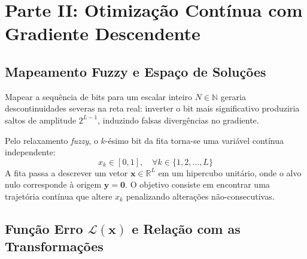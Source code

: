 \documentclass[
	12pt,
	a4paper,
	article,
	twocolumn,
	brazil
]{abntex2}
\begin{document}
\begin{table}[htbp]
\centering
\caption{Desempenho da Busca Gulosa com Poda ($h_2$) até $L = 4096$.}
\label{tab:bench}
\end{table}

\section{Parte II: Otimização Contínua com Gradiente Descendente}

\subsection{Mapeamento Fuzzy e Espaço de Soluções}

Mapear a sequência de bits para um escalar inteiro $N \in \mathbb{N}$ geraria descontinuidades severas na reta real: inverter o bit mais significativo produziria saltos de amplitude $2^{L-1}$, induzindo falsas divergências no gradiente.

Pelo relaxamento \textit{fuzzy}, o $k$-ésimo bit da fita torna-se uma variável contínua independente:
\begin{equation}
x_k \in [0, 1], \quad \forall k \in \{1, 2, \dots, L\}
\end{equation}
A fita passa a descrever um vetor $\mathbf{x} \in \mathbb{R}^L$ em um hipercubo unitário, onde o alvo nulo corresponde à origem $\mathbf{y} = \mathbf{0}$. O objetivo consiste em encontrar uma trajetória contínua que altere $x_k$ penalizando alterações não-consecutivas.

\subsection{Função Erro \texorpdfstring{$\mathcal{L}(\mathbf{x})$}{L(x)} e Relação com as Transformações}
\end{document}

